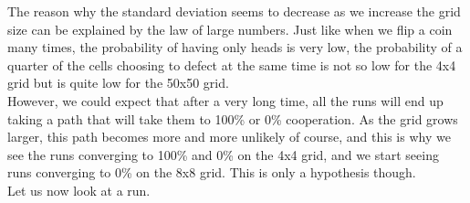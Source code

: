 \documentclass[a4paper]{article}
\begin{document}
The reason why the standard deviation seems to decrease as we increase the grid 
size can be explained by the law of large numbers. Just like when we flip a
coin many times, the probability of having only heads is very low, 
the probability of a quarter of the cells choosing to defect at the same time
is not so low for the 4x4 grid but is quite low for the 50x50 grid. \\

However, we could expect that after a very long time, all the runs will end up
taking a path that will take them to 100\% or 0\% cooperation. As the grid
grows larger, this path becomes more and more unlikely of course, and this is
why we see the runs converging to 100\% and 0\% on the 4x4 grid, and we start
seeing runs converging to 0\% on the 8x8 grid. This is only a hypothesis 
though.\\

Let us now look at a run.
\end{document}
